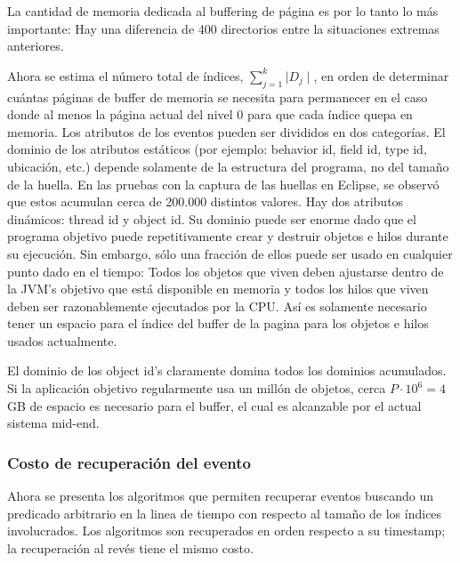 \documentclass[12pt,legalpaper]{report}
\begin{document}
	La cantidad de memoria dedicada al buffering de página es por lo tanto lo más importante:  Hay una diferencia de 400 directorios entre la situaciones extremas anteriores.

	Ahora se estima el número total de índices, $\sum_{j=1}^k{\mid D_j\mid}$, en orden de determinar cuántas páginas de buffer de memoria se necesita para permanecer en el caso donde al menos la página actual del nivel 0 para que cada índice quepa en memoria.  Los atributos de los eventos pueden ser divididos en dos categorías.  El dominio de los atributos estáticos (por ejemplo: behavior id, field id, type id, ubicación, etc.) depende solamente de la estructura del programa, no del tamaño de la huella.  En las pruebas con la captura de las huellas en Eclipse, se observó que estos acumulan cerca de 200.000 distintos valores.  Hay dos atributos dinámicos: thread id y object id.  Su dominio puede ser enorme dado que el programa objetivo puede repetitivamente crear y destruir objetos e hilos durante su ejecución.  Sin embargo, sólo una fracción de ellos puede ser usado en cualquier punto dado en el tiempo:  Todos los objetos que viven deben ajustarse dentro de la JVM's objetivo que está disponible en memoria y todos los hilos que viven deben ser razonablemente ejecutados por la CPU.  Así es solamente necesario tener un espacio para el índice del buffer de la pagina para los objetos e hilos usados actualmente.

	El dominio de los  object id's claramente domina todos los dominios acumulados.  Si la aplicación objetivo regularmente usa un millón de objetos, cerca $P\cdot10^6 = 4$ GB de espacio es necesario para el buffer, el cual es alcanzable por el actual sistema mid-end.


			\subsubsection{Costo de recuperación del evento}

	Ahora se presenta los algoritmos que permiten recuperar eventos buscando un predicado arbitrario en la linea de tiempo con respecto al tamaño de los índices involucrados.  Los algoritmos son recuperados en orden respecto a su timestamp; la recuperación al revés tiene el mismo costo.
\end{document}
